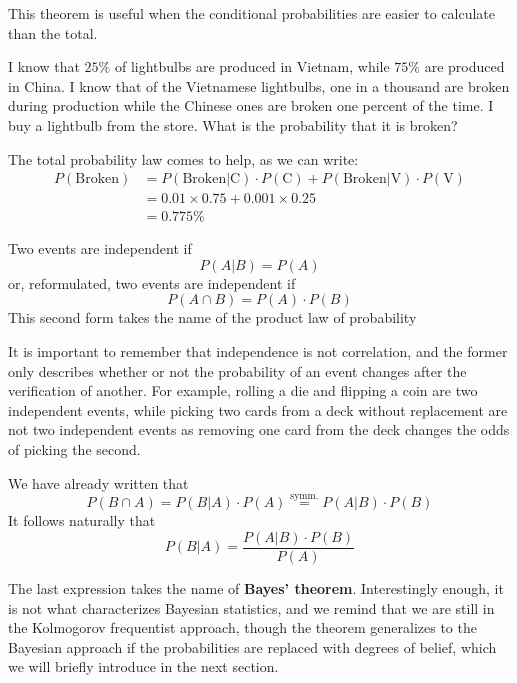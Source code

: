 This theorem is useful when the conditional probabilities are easier to calculate than the total.
\begin{example}
	I know that $25\%$ of lightbulbs are produced in Vietnam, while $75\%$ are produced in China. I know that of the Vietnamese lightbulbs, one in a thousand are broken during production while the Chinese ones are broken one percent of the time. I buy a lightbulb from the store. What is the probability that it is broken?
	
	The total probability law comes to help, as we can write:
	\begin{align*}
	P(\text{Broken}) &= P(\text{Broken}|\text{C})\cdot P(\text{C}) + P(\text{Broken}|\text{V})\cdot P(\text{V}) \\
	&= 0.01\times0.75 + 0.001\times0.25 \\
	&= 0.775\%
	\end{align*}
\end{example}

\begin{definition}
	Two events are independent if 
	\[
	P(A|B)=P(A)
	\]
	or, reformulated, two events are independent if
	\[
	P(A\cap B) = P(A)\cdot P(B)
	\]	
	This second form takes the name of the product law of probability
\end{definition}

It is important to remember that independence is not correlation, and the former only describes whether or not the probability of an event changes after the verification of another. For example, rolling a die and flipping a coin are two independent events, while picking two cards from a deck without replacement are not two independent events as removing one card from the deck changes the odds of picking the second. 

\begin{theorem}
	We have already written that 
	\[
	P(B\cap A) = P(B|A)\cdot P(A) \overset{\scriptscriptstyle \text{symm.}}{=} P(A|B)\cdot P(B)
	\]
	It follows naturally that
	\[
	P(B|A) = \frac{P(A|B)\cdot P(B)}{P(A)}
	\]
\label{th:Bayes}
\end{theorem}	

The last expression takes the name of \textbf{Bayes' theorem}. Interestingly enough, it is not what characterizes Bayesian statistics, and we remind that we are still in the Kolmogorov frequentist approach, though the theorem generalizes to the Bayesian approach if the probabilities are replaced with degrees of belief, which we will briefly introduce in the next section.

